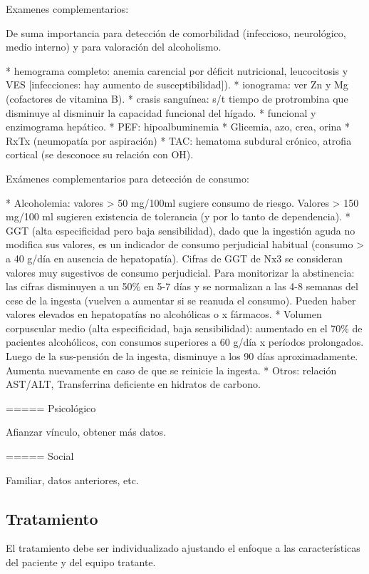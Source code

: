 Examenes complementarios:

De suma importancia para detección de comorbilidad (infeccioso, neurológico, medio interno) y para valoración del alcoholismo.

* hemograma completo: anemia carencial por déficit nutricional, leucocitosis y VES [infecciones: hay aumento de susceptibilidad]).
* ionograma: ver Zn y Mg (cofactores de vitamina B).
* crasis sanguínea: s/t tiempo de protrombina que disminuye al disminuir la capacidad funcional del hígado.
* funcional y enzimograma hepático.
* PEF: hipoalbuminemia
* Glicemia, azo, crea, orina
* RxTx (neumopatía por aspiración)
* TAC: hematoma subdural crónico, atrofia cortical (se desconoce su relación con OH).

Exámenes complementarios para detección de consumo:

* Alcoholemia: valores > 50 mg/100ml sugiere consumo de riesgo. Valores > 150 mg/100 ml sugieren existencia de tolerancia (y por lo tanto de dependencia).
* GGT (alta especificidad pero baja sensibilidad), dado que la ingestión aguda no modifica sus valores, es un indicador de consumo perjudicial habitual (consumo > a 40 g/día en ausencia de hepatopatía). Cifras de GGT de Nx3 se consideran valores muy sugestivos de consumo perjudicial. Para monitorizar la abstinencia: las cifras disminuyen a un 50\% en 5-7 días y se normalizan a las 4-8 semanas del cese de la ingesta (vuelven a aumentar si se reanuda el consumo). Pueden haber valores elevados en hepatopatías no alcohólicas o x fármacos.
* Volumen corpuscular medio (alta especificidad, baja sensibilidad): aumentado en el 70\% de pacientes alcohólicos, con consumos superiores a 60 g/día x períodos prolongados. Luego de la sus-pensión de la ingesta, disminuye a los 90 días aproximadamente. Aumenta nuevamente en caso de que se reinicie la ingesta.
* Otros: relación AST/ALT, Transferrina deficiente en hidratos de carbono.

===== Psicológico

Afianzar vínculo, obtener más datos.

===== Social

Familiar, datos anteriores, etc.

\subsection*{Tratamiento}

El tratamiento debe ser individualizado ajustando el enfoque a las características del paciente y del equipo tratante.

